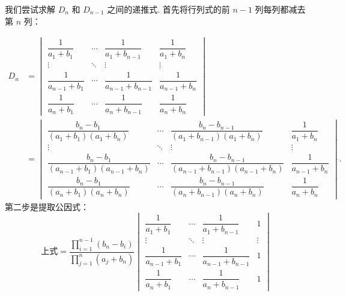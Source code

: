 \documentclass[UTF8,12pt,a4paper,fontset=fandol]{ctexart}
\begin{document}
\begin{solve}
我们尝试求解 $D_n$ 和 $D_{n-1}$ 之间的递推式. 首先将行列式的前 $n-1$ 列每列都减去第 $n$ 列：

    \begin{align*}
        D_n & = \begin{vmatrix}
                    \dfrac{1}{a_1+b_1}     & \cdots & \dfrac{1}{a_1+b_{n-1}}     & \dfrac{1}{a_1+b_n}     \\[2ex]
                    \vdots                 & \ddots & \vdots                     & \vdots                 \\[2ex]
                    \dfrac{1}{a_{n-1}+b_1} & \cdots & \dfrac{1}{a_{n-1}+b_{n-1}} & \dfrac{1}{a_{n-1}+b_n} \\[2ex]
                    \dfrac{1}{a_n+b_1}     & \cdots & \dfrac{1}{a_n+b_{n-1}}     & \dfrac{1}{a_n+b_n}
                \end{vmatrix}                                                                       \\[2ex]
            & = \begin{vmatrix}
                    \dfrac{b_n-b_1}{(a_1+b_1)(a_1+b_n)}         & \cdots & \dfrac{b_n-b_{n-1}}{(a_1+b_{n-1})(a_1+b_n)}         & \dfrac{1}{a_1+b_n}     \\[2ex]
                    \vdots                                      & \ddots & \vdots                                              & \vdots                 \\[2ex]
                    \dfrac{b_n-b_1}{(a_{n-1}+b_1)(a_{n-1}+b_n)} & \cdots & \dfrac{b_n-b_{n-1}}{(a_{n-1}+b_{n-1})(a_{n-1}+b_n)} & \dfrac{1}{a_{n-1}+b_n} \\[2ex]
                    \dfrac{b_n-b_1}{(a_n+b_1)(a_n+b_n)}         & \cdots & \dfrac{b_n-b_{n-1}}{(a_n+b_{n-1})(a_n+b_n)}         & \dfrac{1}{a_n+b_n}
                \end{vmatrix}.
    \end{align*}
    第二步是提取公因式：
    \[ \text{上式} = \dfrac{\prod\limits_{i=1}^{n-1}(b_n-b_i)}{\prod\limits_{j=1}^{n}(a_j+b_n)}
        \begin{vmatrix}
            \dfrac{1}{a_1+b_1}     & \cdots & \dfrac{1}{a_1+b_{n-1}}     & 1      \\[2ex]
            \vdots                 & \ddots & \vdots                     & \vdots \\[2ex]
            \dfrac{1}{a_{n-1}+b_1} & \cdots & \dfrac{1}{a_{n-1}+b_{n-1}} & 1      \\[2ex]
            \dfrac{1}{a_n+b_1}     & \cdots & \dfrac{1}{a_n+b_{n-1}}     & 1

\end{vmatrix}\]
\end{solve}
\end{document}

